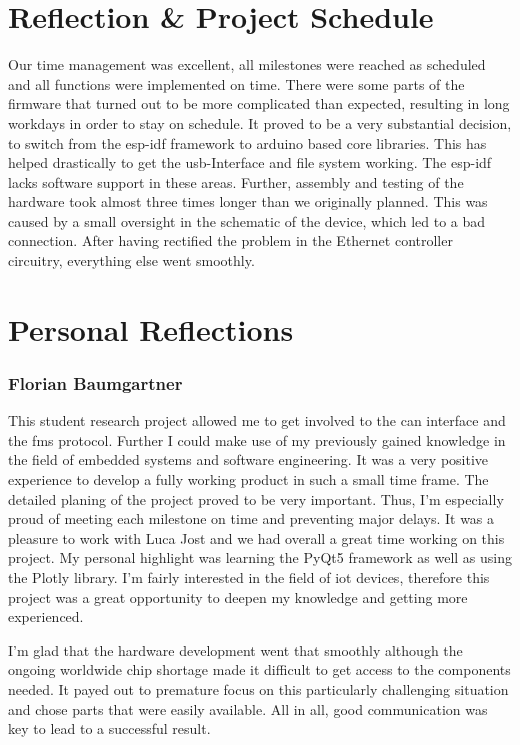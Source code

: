 \newpage
\section{Reflection \& Project Schedule}
Our time management was excellent, all milestones were reached as scheduled and all functions were implemented on time. There were some parts of the firmware that turned out to be more complicated than expected, resulting in long workdays in order to stay on schedule. It proved to be a very substantial decision, to switch from the \gls{esp-idf} framework to \gls{arduino} based core libraries. This has helped drastically to get the \acrshort{usb}-Interface and file system working. The \gls{esp-idf} lacks software support in these areas. Further, assembly and testing of the hardware took almost three times longer than we originally planned. This was caused by a small oversight in the schematic of the device, which led to a bad connection. After having rectified the problem in the Ethernet controller circuitry, everything else went smoothly.

\section{Personal Reflections}

\subsubsection{Florian Baumgartner}
This student research project allowed me to get involved to the \acrshort{can} interface and the \acrshort{fms} protocol. Further I could make use of my previously gained knowledge in the field of embedded systems and software engineering. It was a very positive experience to develop a fully working product in such a small time frame. The detailed planing of the project proved to be very important. Thus, I'm especially proud of meeting each milestone on time and preventing major delays. \newline
It was a pleasure to work with Luca Jost and we had overall a great time working on this project. My personal highlight was learning the PyQt5 framework as well as using the Plotly library. I'm fairly interested in the field of \acrshort{iot} devices, therefore this project was a great opportunity to deepen my knowledge and getting more experienced.

I'm glad that the hardware development went that smoothly although the ongoing worldwide chip shortage made it difficult to get access to the components needed. It payed out to premature focus on this particularly challenging situation and chose parts that were easily available. All in all, good communication was key to lead to a successful result.

